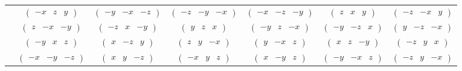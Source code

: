 \documentclass[fleqn,9pt,landscape]{jsarticle}
\begin{document}
\begin{center}
\begin{longtable}{ccccccc}
& $ \begin{pmatrix} - x & z & y \end{pmatrix} $ & $ \begin{pmatrix} - y & - x & - z \end{pmatrix} $ & $ \begin{pmatrix} - z & - y & - x \end{pmatrix} $ & $ \begin{pmatrix} - x & - z & - y \end{pmatrix} $ & $ \begin{pmatrix} z & x & y \end{pmatrix} $ & $ \begin{pmatrix} - z & - x & y \end{pmatrix} $ \\
& $ \begin{pmatrix} z & - x & - y \end{pmatrix} $ & $ \begin{pmatrix} - z & x & - y \end{pmatrix} $ & $ \begin{pmatrix} y & z & x \end{pmatrix} $ & $ \begin{pmatrix} - y & z & - x \end{pmatrix} $ & $ \begin{pmatrix} - y & - z & x \end{pmatrix} $ & $ \begin{pmatrix} y & - z & - x \end{pmatrix} $ \\
& $ \begin{pmatrix} - y & x & z \end{pmatrix} $ & $ \begin{pmatrix} x & - z & y \end{pmatrix} $ & $ \begin{pmatrix} z & y & - x \end{pmatrix} $ & $ \begin{pmatrix} y & - x & z \end{pmatrix} $ & $ \begin{pmatrix} x & z & - y \end{pmatrix} $ & $ \begin{pmatrix} - z & y & x \end{pmatrix} $ \\
& $ \begin{pmatrix} - x & - y & - z \end{pmatrix} $ & $ \begin{pmatrix} x & y & - z \end{pmatrix} $ & $ \begin{pmatrix} - x & y & z \end{pmatrix} $ & $ \begin{pmatrix} x & - y & z \end{pmatrix} $ & $ \begin{pmatrix} - y & - x & z \end{pmatrix} $ & $ \begin{pmatrix} - z & y & - x \end{pmatrix} $ \\

\end{longtable}
\end{center}
\end{document}
